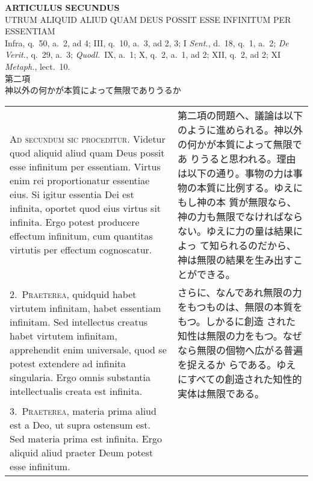 \documentclass[10pt]{jsarticle} %
\begin{document}
\begin{center}
 {\Large {\bf ARTICULUS SECUNDUS}}\\
 {\large UTRUM ALIQUID ALIUD QUAM DEUS POSSIT ESSE INFINITUM PER ESSENTIAM}\\
 {\footnotesize Infra, q.~50, a.~2, ad 4; III, q.~10, a.~3, ad 2, 3; I
 {\itshape Sent.}, d.~18, q.~1, a.~2; {\itshape De Verit.}, q.~29, a.~3;
 {\itshape Quodl.}~IX, a.~1; X, q.~2, a.~1, ad 2; XII, q.~2, ad 2; XI
 {\itshape Metaph.}, lect.~10.}\\
 {\Large 第二項\\神以外の何かが本質によって無限でありうるか}
\end{center}

\begin{longtable}{p{21em}p{21em}}

{\huge A}{\scshape d secundum sic proceditur}. Videtur quod aliquid
aliud quam Deus possit esse infinitum per essentiam. Virtus enim rei
proportionatur essentiae eius. Si igitur essentia Dei est infinita,
oportet quod eius virtus sit infinita. Ergo potest producere effectum
infinitum, cum quantitas virtutis per effectum cognoscatur.

&

第二項の問題へ、議論は以下のように進められる。神以外の何かが本質によって無限であ
 りうると思われる。理由は以下の通り。事物の力は事物の本質に比例する。ゆえにもし神の本
 質が無限なら、神の力も無限でなければならない。ゆえに力の量は結果によっ
 て知られるのだから、神は無限の結果を生み出すことができる。


\\

2.~{\scshape Praeterea}, quidquid habet virtutem infinitam, habet essentiam
infinitam. Sed intellectus creatus habet virtutem infinitam, apprehendit
enim universale, quod se potest extendere ad infinita singularia. Ergo
omnis substantia intellectualis creata est infinita.

&

さらに、なんであれ無限の力をもつものは、無限の本質をもつ。しかるに創造
 された知性は無限の力をもつ。なぜなら無限の個物へ広がる普遍を捉えるか
 らである。ゆえにすべての創造された知性的実体は無限である。



\\

3.~{\scshape Praeterea}, materia prima aliud est a Deo, ut supra
ostensum est. Sed materia prima est infinita. Ergo aliquid aliud praeter
Deum potest esse infinitum.


\end{longtable}
\end{document}

